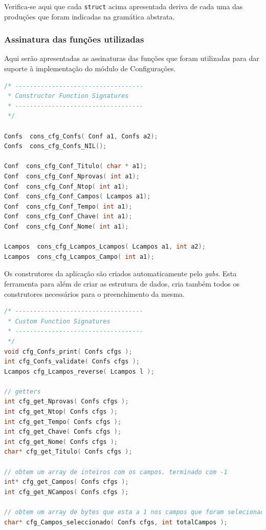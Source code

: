 \documentclass[11pt, a4paper, oneside]{article}
\begin{document}
Verifica-se aqui que cada \texttt{struct} acima apresentada deriva de cada uma das produções que foram indicadas na gramática abstrata.

\newpage
\subsubsection{Assinatura das funções utilizadas}
Aqui serão apresentadas as assinaturas das funções que foram utilizadas para dar suporte à implementação do módulo de Configurações.

\begin{lstlisting}[language=C, caption={Construtores do módulo de configuração.}]
/* -----------------------------------
 * Constructor Function Signatures
 * -----------------------------------
 */

Confs  cons_cfg_Confs( Conf a1, Confs a2);
Confs  cons_cfg_Confs_NIL();

Conf  cons_cfg_Conf_Titulo( char * a1);
Conf  cons_cfg_Conf_Nprovas( int a1);
Conf  cons_cfg_Conf_Ntop( int a1);
Conf  cons_cfg_Conf_Campos( Lcampos a1);
Conf  cons_cfg_Conf_Tempo( int a1);
Conf  cons_cfg_Conf_Chave( int a1);
Conf  cons_cfg_Conf_Nome( int a1);

Lcampos  cons_cfg_Lcampos_Lcampos( Lcampos a1, int a2);
Lcampos  cons_cfg_Lcampos_Campo( int a1);
\end{lstlisting} 

Os construtores da aplicação são criados automaticamente pelo \emph{gabs}. Esta ferramenta para além de criar as estrutura de dados, cria também todos os construtores necessários para o preenchimento da mesma.

\begin{lstlisting}[language=C, caption={Funções do módulo de configuração.}]
/* -----------------------------------
 * Custom Function Signatures
 * -----------------------------------
 */
void cfg_Confs_print( Confs cfgs );
int cfg_Confs_validate( Confs cfgs );
Lcampos cfg_Lcampos_reverse( Lcampos l );

// getters
int cfg_get_Nprovas( Confs cfgs );
int cfg_get_Ntop( Confs cfgs );
int cfg_get_Tempo( Confs cfgs );
int cfg_get_Chave( Confs cfgs );
int cfg_get_Nome( Confs cfgs );
char* cfg_get_Titulo( Confs cfgs );

// obtem um array de inteiros com os campos. terminado com -1
int* cfg_get_Campos( Confs cfgs );
int cfg_get_NCampos( Confs cfgs );

// obtem um array de bytes que esta a 1 nos campos que foram selecionados
char* cfg_Campos_seleccionado( Confs cfgs, int totalCampos );
\end{lstlisting} 
\end{document}

